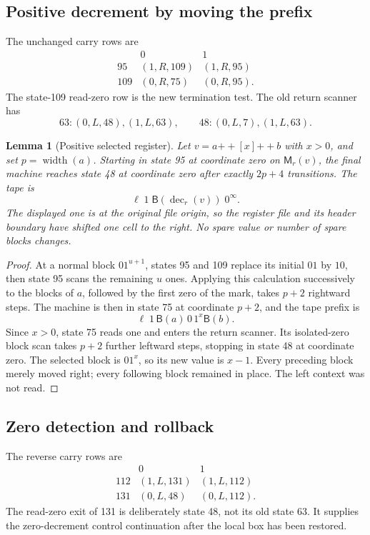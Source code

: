\documentclass[11pt]{article}
\newtheorem{lemma}{Lemma}
\newcommand{\B}{\mathsf B}
\newcommand{\M}{\mathsf M}
\newcommand{\width}{\operatorname{width}}
\newcommand{\Dec}{\operatorname{dec}}
\newcommand{\concat}{\mathbin{+\!+}}
\begin{document}
\subsection{Positive decrement by moving the prefix}

The unchanged carry rows are
\[
\begin{array}{c|cc}
 &0&1\\ \hline
95&(1,R,109)&(1,R,95)\\
109&(0,R,75)&(0,R,95).
\end{array}
\]
The state-109 read-zero row is the new termination test.  The old return
scanner has
\[
63: (0,L,48),(1,L,63),\qquad
48: (0,L,7),(1,L,63).
\]

\begin{lemma}[Positive selected register]\label{lem:positive}
Let $v=a\concat[x]\concat b$ with $x>0$, and set $p=\width(a)$.
Starting in state 95 at coordinate zero on $\M_r(v)$, the final machine
reaches state 48 at coordinate zero after exactly $2p+4$ transitions.
The tape is
\[
 \ell\;1\;\B(\Dec_r(v))\;0^\infty.
\]
The displayed one is at the original file origin, so the register file
and its header boundary have shifted one cell to the right.  No spare
value or number of spare blocks changes.
\end{lemma}
\begin{proof}
At a normal block $01^{u+1}$, states 95 and 109 replace its initial $01$
by $10$, then state 95 scans the remaining $u$ ones.  Applying this
calculation successively to the blocks of $a$, followed by the first
zero of the mark, takes $p+2$ rightward steps.  The machine is then in
state 75 at coordinate $p+2$, and the tape prefix is
\[
 \ell\;1\,\B(a)\,0\,1^x\B(b).
\]
Since $x>0$, state 75 reads one and enters the return scanner.  Its
isolated-zero block scan takes $p+2$ further leftward steps, stopping
in state 48 at coordinate zero.  The selected block is $01^x$, so its
new value is $x-1$.  Every preceding block merely moved right; every
following block remained in place.  The left context was not read.
\end{proof}

\subsection{Zero detection and rollback}

The reverse carry rows are
\[
\begin{array}{c|cc}
 &0&1\\ \hline
112&(1,L,131)&(1,L,112)\\
131&(0,L,48)&(0,L,112).
\end{array}
\]
The read-zero exit of 131 is deliberately state 48, not its old state 63.
It supplies the zero-decrement control continuation after the local box
has been restored.
\end{document}
